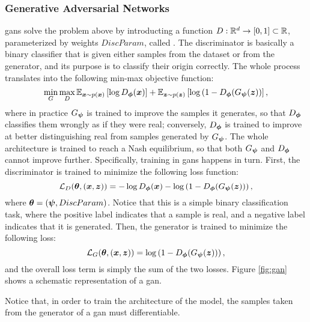 \subsubsection*{Generative Adversarial Networks}
\glspl{gan} \citep{goodfellow2014gan} solve the problem above by introducting a function $D: \mathbb{R}^d \rightarrow [0,1] \subset \mathbb{R}$, parameterized by weights $DiscParam$, called . The discriminator is basically a binary classifier that is given either samples from the dataset or from the generator, and its purpose is to classify their origin correctly. The whole process translates into the following min-max objective function:
$$\min_{G} \max_{D} \Expect_{\Vector{x} \sim p(\Vector{x})}\Brack{\log \Discriminator(\Vector{x})} + \Expect_{\Vector{z} \sim p(\Vector{z})}\Brack{\log\Par{1-\Discriminator(\Generator(\Vector{z})}},$$
where in practice $G_{\boldsymbol{\psi}}$ is trained to improve the samples it generates, so that $D_{\boldsymbol{\phi}}$ classifies them wrongly as if they were real; conversely, $D_{\boldsymbol{\phi}}$ is trained to improve at better distinguishing real from samples generated by $G_{\boldsymbol{\psi}}$. The whole architecture is trained to reach a Nash equilibrium, so that both $G_{\boldsymbol{\psi}}$ and $D_{\boldsymbol{\phi}}$ cannot improve further. Specifically, training in \glspl{gan} happens in turn. First, the discriminator is trained to minimize the following loss function:
$$\Loss_D(\Param, (\Vector{x}, \Vector{z})) =  -\log \Discriminator(\Vector{x}) -\log\Par{1-\Discriminator(\Generator(\Vector{z}))},$$
where $\boldsymbol{\theta} = (\boldsymbol{\psi}, DiscParam)$. Notice that this is a simple binary classification task, where the positive label indicates that a sample is real, and a negative label indicates that it is generated. Then, the generator is trained to minimize the following loss:
$$\Loss_G(\Param, (\Vector{x}, \Vector{z})) = \log\Par{1-\Discriminator(\Generator(\Vector{z}))},$$
and the overall loss term is simply the sum of the two losses. Figure \ref{fig:gan} shows a schematic representation of a \gls{gan}.
\begin{figure*}[h!]
    \centering
    \resizebox{.75\textwidth}{!}{}
    \caption{A Generative Adversarial Network. Here, the tilde symbol over the vector yielded by the generator indicates that it does not come from the training set but it is generated. The discriminator $D$ must distinguish between generated and real samples (indicated without the tilde).}
    \label{fig:gan}
\end{figure*}
Notice that, in order to train the architecture of the model, the samples taken from the generator of a \gls{gan} must differentiable.
